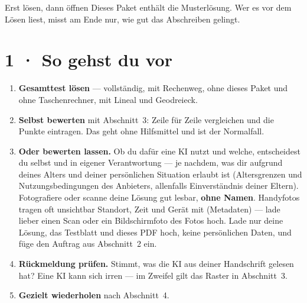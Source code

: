 \documentclass[11pt]{article}
\begin{document}

\begin{lpachtung}{Erst lösen, dann öffnen}
Dieses Paket enthält die Musterlösung. Wer es vor dem Lösen liest, misst am Ende nur, wie gut das Abschreiben gelingt.
\end{lpachtung}

\section*{1 · So gehst du vor}
\begin{enumerate}[leftmargin=*,itemsep=2pt]
\item \textbf{Gesamttest lösen} — vollständig, mit Rechenweg, ohne dieses Paket und ohne Taschenrechner, mit Lineal und Geodreieck.
\item \textbf{Selbst bewerten} mit Abschnitt~3: Zeile für Zeile vergleichen und die Punkte eintragen. Das geht ohne Hilfsmittel
  und ist der Normalfall.
\item \textbf{Oder bewerten lassen.} Ob du dafür eine KI nutzt und welche, entscheidest du selbst und in eigener Verantwortung —
  je nachdem, was dir aufgrund deines Alters und deiner persönlichen Situation erlaubt ist (Altersgrenzen und
  Nutzungsbedingungen des Anbieters, allenfalls Einverständnis deiner Eltern). Fotografiere oder scanne deine Lösung gut lesbar,
  \textbf{ohne Namen}. Handyfotos tragen oft unsichtbar Standort, Zeit und Gerät mit (Metadaten) — lade lieber einen Scan oder ein
  Bildschirmfoto des Fotos hoch. Lade nur deine Lösung, das Testblatt und dieses PDF hoch, keine persönlichen Daten, und füge den Auftrag aus
  Abschnitt~2 ein.
\item \textbf{Rückmeldung prüfen.} Stimmt, was die KI aus deiner Handschrift gelesen hat? Eine KI kann sich irren —
  im Zweifel gilt das Raster in Abschnitt~3.
\item \textbf{Gezielt wiederholen} nach Abschnitt~4.
\end{enumerate}
\end{document}
